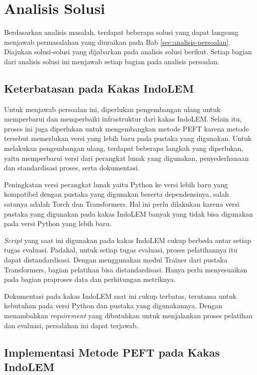 \section{Analisis Solusi}

Berdasarkan analisis masalah, terdapat beberapa solusi yang dapat langsung menjawab permasalahan yang diuraikan pada Bab \ref{sec:analisis-persoalan}. Diajukan solusi-solusi yang dijabarkan pada analisis solusi berikut. Setiap bagian dari analisis solusi ini  menjawab setiap bagian pada analisis persoalan.

\subsection{Keterbatasan pada Kakas IndoLEM}

Untuk menjawab persoalan ini, diperlukan pengembangan ulang untuk memperbarui dan memperbaiki infrastruktur dari kakas IndoLEM. Selain itu, proses ini juga diperlukan untuk mengembangkan metode PEFT karena metode tersebut memerlukan versi yang lebih baru pada pustaka yang digunakan. Untuk melakukan pengembangan ulang, terdapat beberapa langkah yang diperlukan, yaitu memperbarui versi dari perangkat lunak yang digunakan, penyederhanaan dan standardisasi proses, serta dokumentasi.

Peningkatan versi perangkat lunak yaitu Python ke versi lebih baru yang kompatibel dengan pustaka yang  digunakan beserta dependensinya, salah satunya adalah Torch dan Transformers. Hal ini perlu dilakukan karena versi pustaka yang digunakan pada kakas IndoLEM banyak yang tidak bisa digunakan pada versi Python yang lebih baru.

\textit{Script} yang saat ini digunakan pada kakas IndoLEM cukup berbeda antar setiap tugas evaluasi. Padahal, untuk setiap tugas evaluasi, proses pelatihannya itu dapat distandardisasi. Dengan menggunakan modul Trainer dari pustaka Transformers, bagian pelatihan bisa distandardisasi. Hanya perlu menyesuaikan pada bagian praproses data dan perhitungan metriknya.

Dokumentasi pada kakas IndoLEM saat ini cukup terbatas, terutama untuk kebutuhan pada versi Python dan pustaka yang digunakannya. Dengan menambahkan \textit{requirement} yang dibutuhkan untuk menjalankan proses pelatihan dan evaluasi, persalahan ini dapat terjawab.

\subsection{Implementasi Metode PEFT pada Kakas IndoLEM}

